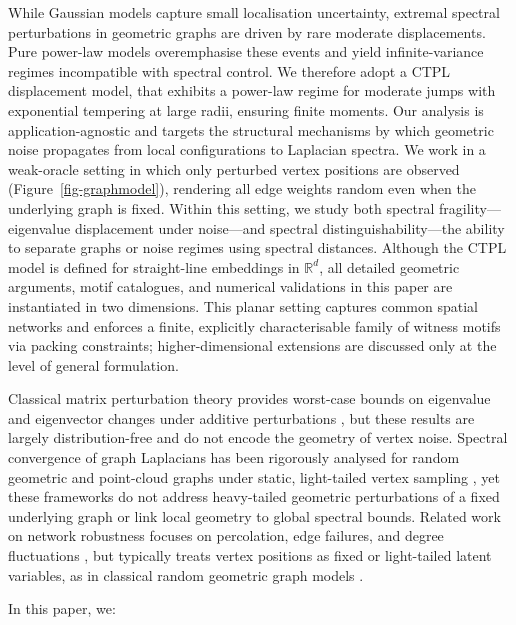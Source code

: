 \documentclass[
  11pt,
  letterpaper]{siamart251216}
\begin{document}
While Gaussian models capture small localisation uncertainty, extremal
spectral perturbations in geometric graphs are driven by rare moderate
displacements. Pure power-law models overemphasise these events and
yield infinite-variance regimes incompatible with spectral control. We
therefore adopt a \ac{CTPL} displacement model, that exhibits a
power-law regime for moderate jumps with exponential tempering at large
radii, ensuring finite moments. Our analysis is application-agnostic and
targets the structural mechanisms by which geometric noise propagates
from local configurations to Laplacian spectra. We work in a weak-oracle
setting in which only perturbed vertex positions are observed
(Figure~\ref{fig-graphmodel}), rendering all edge weights random even
when the underlying graph is fixed. Within this setting, we study both
spectral fragility---eigenvalue displacement under noise---and spectral
distinguishability---the ability to separate graphs or noise regimes
using spectral distances. Although the \ac{CTPL} model is defined for
straight-line embeddings in \(\mathbb{R}^d\), all detailed geometric
arguments, motif catalogues, and numerical validations in this paper are
instantiated in two dimensions. This planar setting captures common
spatial networks and enforces a finite, explicitly characterisable
family of witness motifs via packing constraints; higher-dimensional
extensions are discussed only at the level of general formulation.

Classical matrix perturbation theory provides worst-case bounds on
eigenvalue and eigenvector changes under additive perturbations
\citep{StewartSun1990, Bhatia1997}, but these results are largely
distribution-free and do not encode the geometry of vertex noise.
Spectral convergence of graph Laplacians has been rigorously analysed
for random geometric and point-cloud graphs under static, light-tailed
vertex sampling
\citep{Penrose2003Random, Hein2007GraphLaplacians, GarciaTrillosFoCM2020},
yet these frameworks do not address heavy-tailed geometric perturbations
of a fixed underlying graph or link local geometry to global spectral
bounds. Related work on network robustness focuses on percolation, edge
failures, and degree fluctuations
\citep{Barabasi1999Emergence, Holme2017}, but typically treats vertex
positions as fixed or light-tailed latent variables, as in classical
random geometric graph models \citep{Penrose2003Random}.

In this paper, we:
\end{document}
